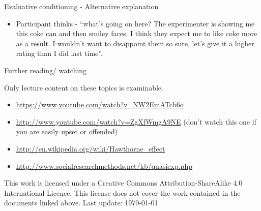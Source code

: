 \documentclass{beamer}
\begin{document}
\begin{frame}{Evaluative conditioning - Alternative explanation}
\begin{itemize}
\item Participant thinks - ``what's going on here? The experimenter is showing me this coke can and then smiley faces. I think they expect me to like coke more as a result. I wouldn't want to disappoint them so sure, let's give it a higher rating than I did last time''.
\end{itemize}
\end{frame}

\begin{frame}{Further reading/ watching}

Only lecture content on these topics is examinable.

\begin{itemize}
\item \url{https://www.youtube.com/watch?v=NW2EmATcb6o}
\item \url{http://www.youtube.com/watch?v=ZgXfWmgA9NE} (don't watch this one if you are easily upset or offended)	
\item  \url{http://en.wikipedia.org/wiki/Hawthorne_effect}
\item  \url{http://www.socialresearchmethods.net/kb/quasiexp.php}
\end{itemize}

\tiny This work is licensed under a Creative Commons
Attribution-ShareAlike 4.0 International Licence. This license does
not cover the work contained in the documents linked above. Last
update: \today

\end{frame}
\end{document}
